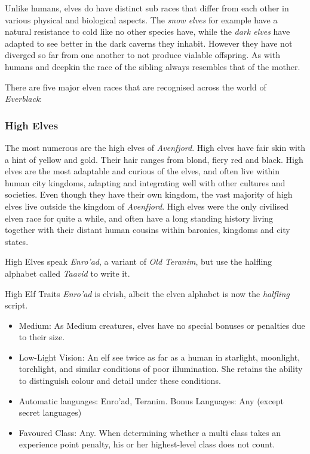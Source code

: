 Unlike humans, elves do have distinct sub races that differ from each other in
various physical and biological aspects. The \emph{snow elves} for example
have a natural resistance to cold like no other species have, while the
\emph{dark elves} have adapted to see better in the dark caverns they
inhabit. However they have not diverged so far from one another to not produce
vialable offspring. As with humans and deepkin the race of the sibling always
resembles that of the mother.

There are five major elven races that are recognised across the world of
\emph{Everblack}:

\subsubsection*{High Elves}
\label{sec:High Elves}

The most numerous are the high elves of \emph{Avenfjord}. High elves have
fair skin with a hint of yellow and gold. Their hair ranges from blond, fiery
red and black. High elves are the most adaptable and curious of the
elves, and often live within human city kingdoms, adapting and integrating
well with other cultures and societies. Even though they have their own
kingdom, the vast majority of high elves live outside the kingdom
of \emph{Avenfjord}. High elves were the only civilised elven race for
quite a while, and often have a long standing history living together with
their distant human cousins within baronies, kingdoms and city states.

High Elves speak \emph{Enro'ad}, a variant of \emph{Old Teranim}, but use the
halfling alphabet called \emph{Taavid} to write it.

\begin{35e}{High Elf Traits}
  \emph{Enro'ad} is elvish, albeit the elven alphabet is now the \emph{halfling}
  script.

  \begin{itemize}[noitemsep]
    \item Medium: As Medium creatures, elves have no special bonuses or
    penalties due to their size.
    \item Low-Light Vision: An elf see twice as far as a human in starlight,
    moonlight, torchlight, and similar conditions of poor illumination. She
    retains the ability to distinguish colour and detail under these
    conditions.
    \item Automatic languages: Enro'ad, Teranim. Bonus Languages: Any (except
      secret languages)
    \item Favoured Class: Any. When determining whether a multi class takes an
    experience point penalty, his or her highest-level class does not count.
  \end{itemize}
\end{35e}

